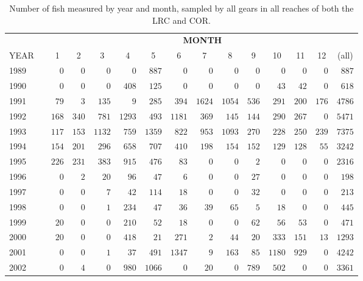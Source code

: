 %
\begin{table}[!tbp]
 \footnotesize
 \caption{Number of fish measured by year and month, sampled by all gears
                  in all reaches of both the LRC and COR.\label{table:Captures}} 
 \begin{center}
 \begin{tabular}{lcrrrrrrrrrrrrr}\hline\hline
\multicolumn{1}{c}{\bfseries }&
\multicolumn{1}{c}{\bfseries }&
\multicolumn{13}{c}{\bfseries MONTH}
\tabularnewline \cline{1-15}
\multicolumn{1}{c}{YEAR}&\multicolumn{1}{c}{}&\multicolumn{1}{c}{1}&\multicolumn{1}{c}{2}&\multicolumn{1}{c}{3}&\multicolumn{1}{c}{4}&\multicolumn{1}{c}{5}&\multicolumn{1}{c}{6}&\multicolumn{1}{c}{7}&\multicolumn{1}{c}{8}&\multicolumn{1}{c}{9}&\multicolumn{1}{c}{10}&\multicolumn{1}{c}{11}&\multicolumn{1}{c}{12}&\multicolumn{1}{c}{(all)}\tabularnewline
\hline
1989&&$  0$&$   0$&$   0$&$    0$&$  887$&$    0$&$   0$&$   0$&$   0$&$   0$&$   0$&$  0$&$  887$\tabularnewline
1990&&$  0$&$   0$&$   0$&$  408$&$  125$&$    0$&$   0$&$   0$&$   0$&$  43$&$  42$&$  0$&$  618$\tabularnewline
1991&&$ 79$&$   3$&$ 135$&$    9$&$  285$&$  394$&$1624$&$1054$&$ 536$&$ 291$&$ 200$&$176$&$ 4786$\tabularnewline
1992&&$168$&$ 340$&$ 781$&$ 1293$&$  493$&$ 1181$&$ 369$&$ 145$&$ 144$&$ 290$&$ 267$&$  0$&$ 5471$\tabularnewline
1993&&$117$&$ 153$&$1132$&$  759$&$ 1359$&$  822$&$ 953$&$1093$&$ 270$&$ 228$&$ 250$&$239$&$ 7375$\tabularnewline
1994&&$154$&$ 201$&$ 296$&$  658$&$  707$&$  410$&$ 198$&$ 154$&$ 152$&$ 129$&$ 128$&$ 55$&$ 3242$\tabularnewline
1995&&$226$&$ 231$&$ 383$&$  915$&$  476$&$   83$&$   0$&$   0$&$   2$&$   0$&$   0$&$  0$&$ 2316$\tabularnewline
1996&&$  0$&$   2$&$  20$&$   96$&$   47$&$    6$&$   0$&$   0$&$  27$&$   0$&$   0$&$  0$&$  198$\tabularnewline
1997&&$  0$&$   0$&$   7$&$   42$&$  114$&$   18$&$   0$&$   0$&$  32$&$   0$&$   0$&$  0$&$  213$\tabularnewline
1998&&$  0$&$   0$&$   1$&$  234$&$   47$&$   36$&$  39$&$  65$&$   5$&$  18$&$   0$&$  0$&$  445$\tabularnewline
1999&&$ 20$&$   0$&$   0$&$  210$&$   52$&$   18$&$   0$&$   0$&$  62$&$  56$&$  53$&$  0$&$  471$\tabularnewline
2000&&$ 20$&$   0$&$   0$&$  418$&$   21$&$  271$&$   2$&$  44$&$  20$&$ 333$&$ 151$&$ 13$&$ 1293$\tabularnewline
2001&&$  0$&$   0$&$   1$&$   37$&$  491$&$ 1347$&$   9$&$ 163$&$  85$&$1180$&$ 929$&$  0$&$ 4242$\tabularnewline
2002&&$  0$&$   4$&$   0$&$  980$&$ 1066$&$    0$&$  20$&$   0$&$ 789$&$ 502$&$   0$&$  0$&$ 3361$\tabularnewline

\end{tabular}
\end{center}
\end{table}
